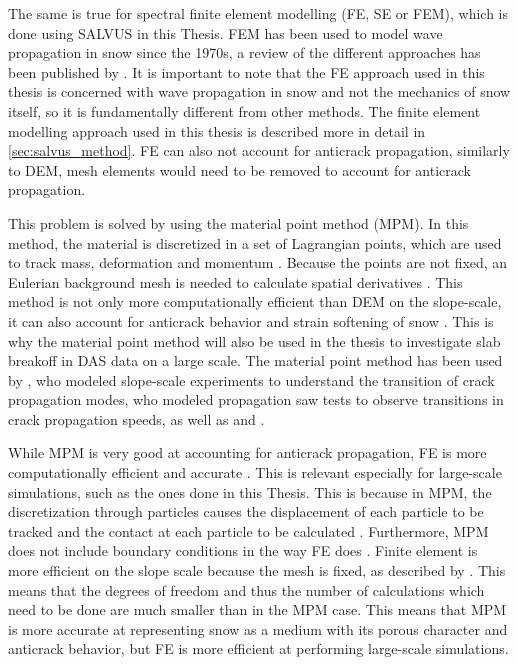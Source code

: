 The same is true for spectral finite element modelling (FE, SE or FEM), which is done using SALVUS in this Thesis. FEM has been used to model wave propagation in snow since the 1970s, a review of the different approaches has been published by \cite{podolskiyReviewFiniteelementModelling2013}. It is important to note that the FE approach used in this thesis is concerned with wave propagation in snow and not the mechanics of snow itself, so it is fundamentally different from other methods. The finite element modelling approach used in this thesis is described more in detail in \ref{sec:salvus_method}. FE can also not account for anticrack propagation, similarly to DEM, mesh elements would need to be removed to account for anticrack propagation. \par

This problem is solved by using the material point method (MPM). In this method, the material is discretized in a set of Lagrangian points, which are used to track mass, deformation and momentum \parencite{bardenhagenMaterialpointMethodGranular2000}. Because the points are not fixed, an Eulerian background mesh is needed to calculate spatial derivatives \parencite{bardenhagenMaterialpointMethodGranular2000}. This method is not only more computationally efficient than DEM on the slope-scale, it can also account for anticrack behavior and strain softening of snow \parencite{gaumeInvestigatingReleaseFlow2019}. This is why the material point method will also be used in the thesis to investigate slab breakoff in DAS data on a large scale. The material point method has been used by \cite{bergfeldSignaturesSubRayleighSupershear2025}, who modeled slope-scale experiments to understand the transition of crack propagation modes, \cite{trottetTransitionSubRayleighAnticrack2022} who modeled propagation saw tests to observe transitions in crack propagation speeds, as well as \cite{gaumeInvestigatingReleaseFlow2019} and \cite{gaumeDynamicAnticrackPropagation2018}. \par

While MPM is very good at accounting for anticrack propagation, FE is more computationally efficient and accurate \parencite{lianAdaptiveFiniteElement2012}. This is relevant especially for large-scale simulations, such as the ones done in this Thesis. This is because in MPM, the discretization through particles causes the displacement of each particle to be tracked and the contact at each particle to be calculated \parencite{zhangModellingLargescaleLandslide2023}. Furthermore, MPM does not include boundary conditions in the way FE does \parencite{coombsImmersedFEMMPM2025}. Finite element is more efficient on the slope scale because the mesh is fixed, as described by \parencite{FiniteElementMethod}. This means that the degrees of freedom and thus the number of calculations which need to be done are much smaller than in the MPM case. This means that MPM is more accurate at representing snow as a medium with its porous character and anticrack behavior, but FE is more efficient at performing large-scale simulations. \par


